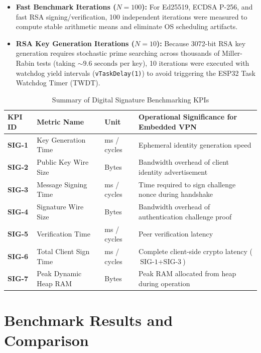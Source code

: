 \documentclass[11pt,a4paper]{article}
\begin{document}
\begin{itemize}
    \item \textbf{Fast Benchmark Iterations ($N = 100$):} For Ed25519, ECDSA P-256, and fast RSA signing/verification, 100 independent iterations were measured to compute stable arithmetic means and eliminate OS scheduling artifacts.
    \item \textbf{RSA Key Generation Iterations ($N = 10$):} Because 3072-bit RSA key generation requires stochastic prime searching across thousands of Miller-Rabin tests (taking $\sim 9.6\text{ seconds}$ per key), 10 iterations were executed with watchdog yield intervals (\texttt{vTaskDelay(1)}) to avoid triggering the ESP32 Task Watchdog Timer (TWDT).
\end{itemize}

\begin{table}[htbp]
\centering
\small
\caption{Summary of Digital Signature Benchmarking KPIs}
\label{tab:sig_kpis}
\begin{tabularx}{\textwidth}{lll X}
\toprule
\textbf{KPI ID} & \textbf{Metric Name} & \textbf{Unit} & \textbf{Operational Significance for Embedded VPN} \\
\midrule
\textbf{SIG-1} & Key Generation Time    & ms / cycles & Ephemeral identity generation speed \\
\textbf{SIG-2} & Public Key Wire Size   & Bytes       & Bandwidth overhead of client identity advertisement \\
\textbf{SIG-3} & Message Signing Time   & ms / cycles & Time required to sign challenge nonce during handshake \\
\textbf{SIG-4} & Signature Wire Size    & Bytes       & Bandwidth overhead of authentication challenge proof \\
\textbf{SIG-5} & Verification Time      & ms / cycles & Peer verification latency \\
\textbf{SIG-6} & Total Client Sign Time & ms / cycles & Complete client-side crypto latency ($\text{SIG-1} + \text{SIG-3}$) \\
\textbf{SIG-7} & Peak Dynamic Heap RAM  & Bytes       & Peak RAM allocated from heap during operation \\
\bottomrule
\end{tabularx}
\end{table}

\section{Benchmark Results and Comparison}
\end{document}
